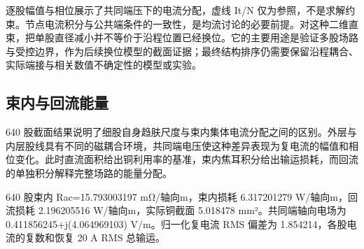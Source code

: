 \documentclass[11pt]{article}
\begin{document}
逐股幅值与相位展示了共同端压下的电流分配，虚线 It/N 仅为参照，不是求解约束。节点电流积分与公共端条件的一致性，是均流讨论的必要前提。对这种二维直束，把单股直径减小并不等价于沿程位置已经换位。它的主要用途是验证多股场路与受控边界，作为后续换位模型的截面证据；最终结构排序仍需要保留沿程耦合、实际端接与相关数值不确定性的模型或实验。


\subsection*{束内与回流能量}
\hypertarget{04.interpretation.heading}{}
640 股截面结果说明了细股自身趋肤尺度与束内集体电流分配之间的区别。外层与内层股线具有不同的磁耦合环境，共同端电压使这种差异表现为复电流的幅值和相位变化。此时直流面积给出铜利用率的基准，束内焦耳积分给出输运损耗，而回流的单独积分解释完整场路的能量分配。


640 股束内 Rac=15.793003197 mΩ/轴向m，束内损耗 6.317201279 W/轴向m，回流损耗 2.196205516 W/轴向m，实际铜截面 5.018478 mm²。共同端轴向电场为 0.411856245+j(4.064969103) V/m。归一化复电流 RMS 偏差为 1.854214，各股电流的复数和恢复 20 A RMS 总输运。
\end{document}
